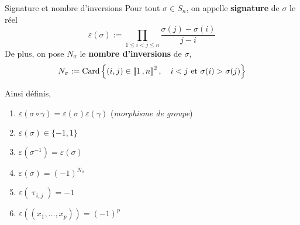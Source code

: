     \begin{defitheo}{Signature et nombre d’inversions}{}
        Pour tout $\sigma \in S_n$, on appelle \textbf{signature} de $\sigma$ le réel 
        \[ \varepsilon(\sigma) := \prod_{1 \leq i < j \leq n} \frac{\sigma(j) - \sigma(i)}{j - i} \]   
        De plus, on pose $N_{\sigma}$ le \textbf{nombre d’inversions} de $\sigma$, 
        \[ N_{\sigma} := \operatorname{Card}\left\{ (i,j) \in \left\llbracket 1 \, , n \right\rrbracket^2, \quad i < j \text{ et } \sigma(i) > \sigma(j) \right\} \]

        Ainsi définis, 
        \begin{enumerate}
            \item $\varepsilon(\sigma \circ \gamma) = \varepsilon(\sigma)\varepsilon(\gamma)$ \quad (\textit{morphisme de groupe})
            \item $\varepsilon(\sigma) \in \{-1,1\}$
            \item $\varepsilon(\sigma^{-1}) = \varepsilon(\sigma)$
            \item $\varepsilon(\sigma) = (-1)^{N_{\sigma}}$
            \item $\varepsilon(\uptau_{i,j}) = -1$
            \item $\varepsilon((x_1,\ldots,x_p)) = (-1)^p$
        \end{enumerate}
    \end{defitheo}

